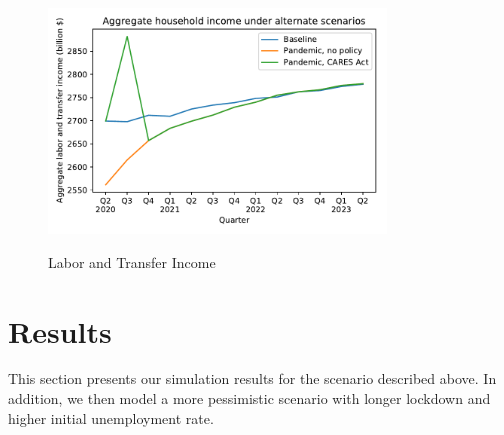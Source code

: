 \documentclass[titlepage]{\econtex}
\begin{document}
\begin{figure}
  \centering
  \caption{Labor and Transfer Income}
  \label{labor_income}
  { \includegraphics[width=0.8\textwidth]{./Figures/AggLT}}
\end{figure}


\section{Results}

This section presents our simulation results for the scenario described above. In addition, we then model a more pessimistic scenario with longer lockdown and higher initial unemployment rate.
\end{document}
